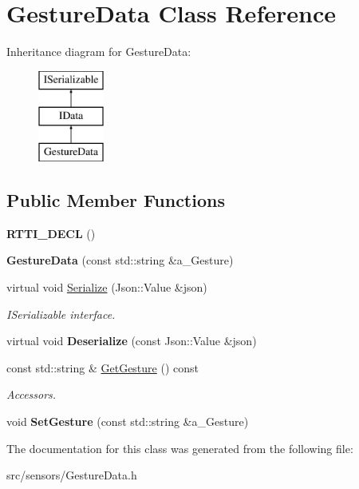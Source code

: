 \hypertarget{class_gesture_data}{}\section{Gesture\+Data Class Reference}
\label{class_gesture_data}
Inheritance diagram for Gesture\+Data\+:\begin{figure}[H]
\begin{center}
\leavevmode
\includegraphics[height=3.000000cm]{class_gesture_data}
\end{center}
\end{figure}
\subsection*{Public Member Functions}
\begin{DoxyCompactItemize}
\item 
\mbox{\label{class_gesture_data_af621636ce91a725ddfde0a0a8b2c45fc}} 
{\bfseries R\+T\+T\+I\+\_\+\+D\+E\+CL} ()
\item 
\mbox{\label{class_gesture_data_aaeb8ce0d155e61d524cce6627b12e120}} 
{\bfseries Gesture\+Data} (const std\+::string \&a\+\_\+\+Gesture)
\item 
\mbox{\label{class_gesture_data_ae443ed652dc782ce640bf8c1bee92e05}} 
virtual void \hyperlink{class_gesture_data_ae443ed652dc782ce640bf8c1bee92e05}{Serialize} (Json\+::\+Value \&json)
\begin{DoxyCompactList}\small\item\em I\+Serializable interface. \end{DoxyCompactList}\item 
\mbox{\label{class_gesture_data_aa43ed19ab947af9807dbb5f5027bb006}} 
virtual void {\bfseries Deserialize} (const Json\+::\+Value \&json)
\item 
\mbox{\label{class_gesture_data_ab4981395f482b77e42f77f76912ce5e0}} 
const std\+::string \& \hyperlink{class_gesture_data_ab4981395f482b77e42f77f76912ce5e0}{Get\+Gesture} () const
\begin{DoxyCompactList}\small\item\em Accessors. \end{DoxyCompactList}\item 
\mbox{\label{class_gesture_data_affdb41d37986bd7125d23c3020a5ee36}} 
void {\bfseries Set\+Gesture} (const std\+::string \&a\+\_\+\+Gesture)
\end{DoxyCompactItemize}


The documentation for this class was generated from the following file\+:\begin{DoxyCompactItemize}
\item 
src/sensors/Gesture\+Data.\+h\end{DoxyCompactItemize}
